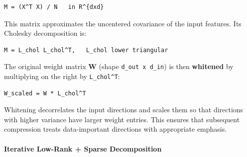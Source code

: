\vspace{0.5em}
\begin{mdframed}[backgroundcolor=codebg, linecolor=codeframe, linewidth=1pt, roundcorner=4pt, innerleftmargin=2pt, innerrightmargin=5pt, innertopmargin=5pt, innerbottommargin=5pt]
\begin{lstlisting}
M = (X^T X) / N   in R^{dxd}
\end{lstlisting}
\end{mdframed}
\vspace{0.5em}

This matrix approximates the uncentered covariance of the input features. Its Cholesky decomposition is:

\vspace{0.5em}
\begin{mdframed}[backgroundcolor=codebg, linecolor=codeframe, linewidth=1pt, roundcorner=4pt, innerleftmargin=2pt, innerrightmargin=5pt, innertopmargin=5pt, innerbottommargin=5pt]
\begin{lstlisting}
M = L_chol L_chol^T,   L_chol lower triangular
\end{lstlisting}
\end{mdframed}
\vspace{0.5em}

The original weight matrix \textbf{W} (shape \texttt{d\_out x d\_in}) is then \textbf{whitened} by multiplying on the right by \texttt{L\_chol\textasciicircum{}T}:

\vspace{0.5em}
\begin{mdframed}[backgroundcolor=codebg, linecolor=codeframe, linewidth=1pt, roundcorner=4pt, innerleftmargin=2pt, innerrightmargin=5pt, innertopmargin=5pt, innerbottommargin=5pt]
\begin{lstlisting}
W_scaled = W * L_chol^T
\end{lstlisting}
\end{mdframed}
\vspace{0.5em}

Whitening decorrelates the input directions and scales them so that directions with higher variance have larger weight entries. This ensures that subsequent compression treats data-important directions with appropriate emphasis.

\paragraph{Iterative Low-Rank + Sparse Decomposition}

